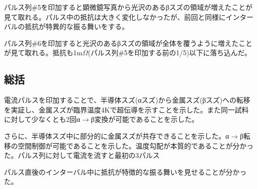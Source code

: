 パルス列\#5を印加すると顕微鏡写真から光沢のあるβスズの領域が増えたことが見て取れる。パルス中の抵抗は大きく変化しなかったが、前回と同様にインターバルの抵抗が特異的な振る舞いをする。

パルス列\#6を印加すると光沢のあるβスズの領域が全体を覆うように増えたことが見て取れる。抵抗も1m$\Omega$(パルス列\#5を印加する前の1/5)以下に落ち込んだ。

\subsection{総括}
電流パルスを印加することで、半導体スズ(αスズ)から金属スズ(βスズ)への転移を実証し、金属スズが臨界温度4Kで超伝導を示すことを示した。また同一試料に対して少なくとも2回α$\to$β変換が可能であることを示した。

さらに、半導体スズ中に部分的に金属スズが共存できることを示した。α$\to$β転移の空間制御が可能であることを示した。温度勾配が本質的であることが分かった。パルス列に対して電流を流すと最初の3パルス

パルス直後のインターバル中に抵抗が特徴的な振る舞いを見せることが分かった。


\clearpage

